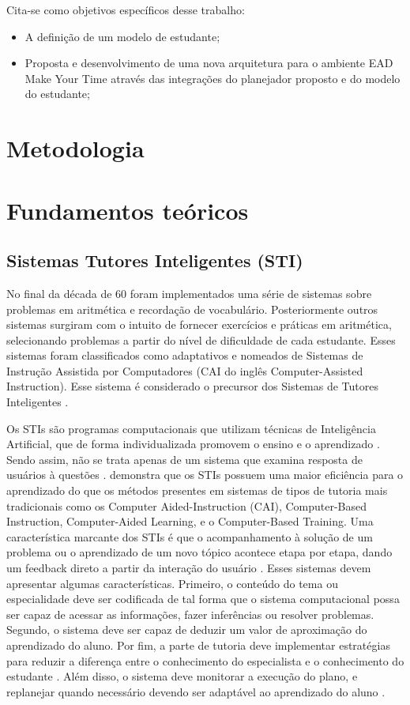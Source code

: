 \documentclass[
12pt,				%
oneside,			%
a4paper,			%
english,			%
brazil				%
]{abntex2ppgsi}
\begin{document}
Cita-se como objetivos específicos desse trabalho:
\begin{itemize}
	\item A definição de um modelo de estudante;
	\item Proposta e desenvolvimento de uma nova arquitetura para o ambiente EAD Make Your Time através das integrações do planejador proposto e do modelo do estudante;
\end{itemize}

\chapter{Metodologia}

\chapter{Fundamentos teóricos}

\section{Sistemas Tutores Inteligentes (STI)}

No final da década de 60 foram implementados uma série de sistemas sobre problemas em aritmética e recordação de vocabulário. Posteriormente outros sistemas surgiram com o intuito de fornecer exercícios e práticas em aritmética, selecionando problemas a partir do nível de dificuldade de cada estudante. Esses sistemas foram classificados como adaptativos e nomeados de Sistemas de Instrução Assistida por Computadores (CAI do inglês Computer-Assisted Instruction). Esse sistema é considerado o precursor dos Sistemas de Tutores Inteligentes \cite{sleeman1982}.

Os STIs são programas computacionais que utilizam técnicas de Inteligência Artificial, que de forma individualizada promovem o ensino e o aprendizado \cite{wenger1987}. Sendo assim, não se trata apenas de um sistema que examina resposta de usuários à questões \cite{sleeman1982}.  demonstra que os STIs possuem uma maior eficiência para o aprendizado do que os métodos presentes em sistemas de tipos de tutoria mais tradicionais como os Computer Aided-Instruction (CAI), Computer-Based Instruction, Computer-Aided Learning, e o Computer-Based Training. Uma característica marcante dos STIs é que o acompanhamento à solução de um problema ou o aprendizado de um novo tópico acontece etapa por etapa, dando um feedback direto a partir da interação do usuário \cite{vanlehn2011}. Esses sistemas devem apresentar algumas características. Primeiro, o conteúdo do tema ou especialidade deve ser codificada de tal forma que o sistema computacional possa ser capaz de acessar as informações, fazer inferências ou resolver problemas. Segundo, o sistema deve ser capaz de deduzir um valor de aproximação do aprendizado do aluno. Por fim, a parte de tutoria deve implementar estratégias para reduzir a diferença entre o conhecimento do especialista e o conhecimento do estudante \cite{polson2013}. Além disso, o sistema deve monitorar a execução do plano, e replanejar quando necessário devendo ser adaptável ao aprendizado do aluno \cite{woo1991}.
\end{document}
